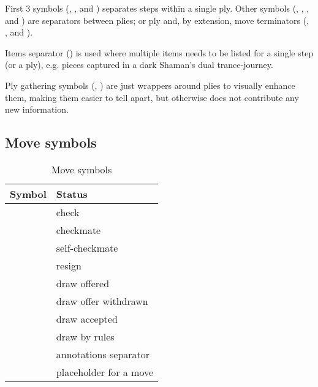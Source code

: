 First 3 symbols (, , and \alg{-}) separates steps within a single ply.
Other symbols (\alg{\~{}}, \alg{|}, , and \alg{;;}) are separators between plies;
or ply and, by extension, move terminators (\alg{||}, , and ).

Items separator (\alg{,}) is used where multiple items needs to be listed for a single
step (or a ply), e.g. pieces captured in a dark Shaman's dual trance-journey.

Ply gathering symbols (\alg{[}, \alg{]}) are just wrappers around plies to visually
enhance them, making them easier to tell apart, but otherwise does not contribute any
new information.

\clearpage %

\subsection*{Move symbols}
\label{sec:Appendix/Summary/Move symbols}

\begin{table}[!h]
\centering
\begin{tabular}{ rl }
\toprule %
\textbf{Symbol}      & \textbf{Status}                \\
\midrule %
\alg{+}              & check                          \\
\alg{\#}             & checkmate                      \\
\alg{\#}             & self-checkmate                 \\
\alg{\#\#}           & resign                         \\
\cmidrule{1-2} %
\alg{(=)}            & draw offered                   \\
\alg{(-)}            & draw offer withdrawn           \\
\alg{(==)}           & draw accepted                  \\
\alg{(===)}          & draw by rules                  \\
\cmidrule{1-2} %
\alg{\_}             & annotations separator          \\
\alg{...}            & placeholder for a move         \\
\bottomrule %
\end{tabular}
\caption{Move symbols}
\label{tbl:Appendix/Summary/Move symbols}
\end{table}

